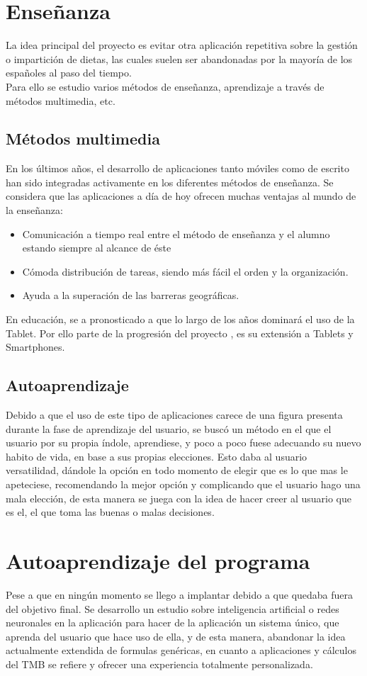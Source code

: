 \section{Enseñanza}
La idea principal del proyecto es evitar otra aplicación repetitiva sobre la gestión o impartición de dietas, las cuales suelen ser abandonadas por la mayoría de los españoles al paso del tiempo.\\

Para ello se estudio varios métodos de enseñanza, aprendizaje a través de métodos multimedia, etc. 
\subsection{Métodos multimedia}
En los últimos años, el desarrollo de aplicaciones tanto móviles como de escrito han sido integradas activamente en los diferentes métodos de enseñanza. Se considera que las aplicaciones a día de hoy ofrecen muchas ventajas al mundo de la enseñanza:
\begin{itemize}
\item	Comunicación a tiempo real entre el método de enseñanza y el alumno estando siempre al alcance de éste
\item	Cómoda distribución de tareas, siendo más fácil el orden y la organización.
\item	Ayuda a la superación de las barreras geográficas.
\end{itemize}

En educación, se a pronosticado a que lo largo de los años dominará el uso de la Tablet. Por ello parte de la progresión del proyecto , es su extensión a Tablets y Smartphones.\cite{enseñanza}
\subsection{Autoaprendizaje}
Debido a que el uso de este tipo de aplicaciones carece de una figura presenta durante la fase de aprendizaje del usuario, se buscó un método en el que el usuario por su propia índole, aprendiese, y poco a poco fuese adecuando su nuevo habito de vida, en base a sus propias elecciones. Esto daba al usuario versatilidad, dándole la opción en todo momento de elegir que es lo que mas le apeteciese, recomendando la mejor opción y complicando que el usuario hago una mala elección, de esta manera se juega con la idea de hacer creer al usuario que es el, el que toma las buenas o malas decisiones.
\section{Autoaprendizaje del programa}
Pese a que en ningún momento se llego a implantar debido a que quedaba fuera del objetivo final. Se desarrollo un estudio sobre inteligencia artificial o redes neuronales en la aplicación para hacer de la aplicación un sistema único, que aprenda del usuario que hace uso de ella, y de esta manera, abandonar la idea actualmente extendida de formulas genéricas, en cuanto a aplicaciones y cálculos del TMB se refiere y ofrecer una experiencia totalmente personalizada.\\

